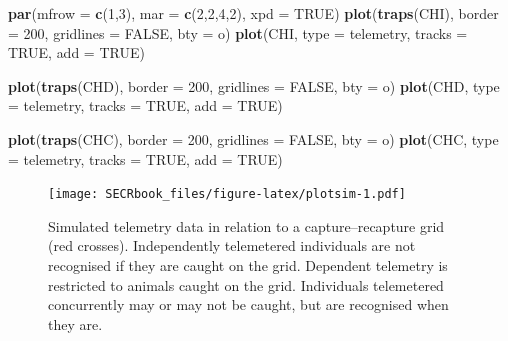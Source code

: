 \documentclass[
]{book}
\newenvironment{Shaded}{\begin{snugshade}}{\end{snugshade}}
\newcommand{\AttributeTok}[1]{\textcolor[rgb]{0.13,0.29,0.53}{#1}}
\newcommand{\ConstantTok}[1]{\textcolor[rgb]{0.56,0.35,0.01}{#1}}
\newcommand{\DecValTok}[1]{\textcolor[rgb]{0.00,0.00,0.81}{#1}}
\newcommand{\FunctionTok}[1]{\textcolor[rgb]{0.13,0.29,0.53}{\textbf{#1}}}
\newcommand{\NormalTok}[1]{#1}
\newcommand{\StringTok}[1]{\textcolor[rgb]{0.31,0.60,0.02}{#1}}
\begin{document}
\begin{Shaded}
\begin{Highlighting}[]
\FunctionTok{par}\NormalTok{(}\AttributeTok{mfrow =} \FunctionTok{c}\NormalTok{(}\DecValTok{1}\NormalTok{,}\DecValTok{3}\NormalTok{), }\AttributeTok{mar =} \FunctionTok{c}\NormalTok{(}\DecValTok{2}\NormalTok{,}\DecValTok{2}\NormalTok{,}\DecValTok{4}\NormalTok{,}\DecValTok{2}\NormalTok{), }\AttributeTok{xpd =} \ConstantTok{TRUE}\NormalTok{)}
\FunctionTok{plot}\NormalTok{(}\FunctionTok{traps}\NormalTok{(CHI), }\AttributeTok{border =} \DecValTok{200}\NormalTok{, }\AttributeTok{gridlines =} \ConstantTok{FALSE}\NormalTok{, }\AttributeTok{bty =} \StringTok{\textquotesingle{}o\textquotesingle{}}\NormalTok{)}
\FunctionTok{plot}\NormalTok{(CHI, }\AttributeTok{type =} \StringTok{\textquotesingle{}telemetry\textquotesingle{}}\NormalTok{, }\AttributeTok{tracks =} \ConstantTok{TRUE}\NormalTok{, }\AttributeTok{add =} \ConstantTok{TRUE}\NormalTok{)}

\FunctionTok{plot}\NormalTok{(}\FunctionTok{traps}\NormalTok{(CHD), }\AttributeTok{border =} \DecValTok{200}\NormalTok{, }\AttributeTok{gridlines =} \ConstantTok{FALSE}\NormalTok{, }\AttributeTok{bty =} \StringTok{\textquotesingle{}o\textquotesingle{}}\NormalTok{)}
\FunctionTok{plot}\NormalTok{(CHD, }\AttributeTok{type =} \StringTok{\textquotesingle{}telemetry\textquotesingle{}}\NormalTok{, }\AttributeTok{tracks =} \ConstantTok{TRUE}\NormalTok{, }\AttributeTok{add =} \ConstantTok{TRUE}\NormalTok{)}

\FunctionTok{plot}\NormalTok{(}\FunctionTok{traps}\NormalTok{(CHC), }\AttributeTok{border =} \DecValTok{200}\NormalTok{, }\AttributeTok{gridlines =} \ConstantTok{FALSE}\NormalTok{, }\AttributeTok{bty =} \StringTok{\textquotesingle{}o\textquotesingle{}}\NormalTok{)}
\FunctionTok{plot}\NormalTok{(CHC, }\AttributeTok{type =} \StringTok{\textquotesingle{}telemetry\textquotesingle{}}\NormalTok{, }\AttributeTok{tracks =} \ConstantTok{TRUE}\NormalTok{, }\AttributeTok{add =} \ConstantTok{TRUE}\NormalTok{)}
\end{Highlighting}
\end{Shaded}

\begin{figure}
\centering
\texttt{[image: SECRbook\_files/figure-latex/plotsim-1.pdf]}
\caption{\label{fig:plotsim}Simulated telemetry data in relation to a capture--recapture grid (red crosses). Independently telemetered individuals are not recognised if they are caught on the grid. Dependent telemetry is restricted to animals caught on the grid. Individuals telemetered concurrently may or may not be caught, but are recognised when they are.}
\end{figure}
\end{document}
